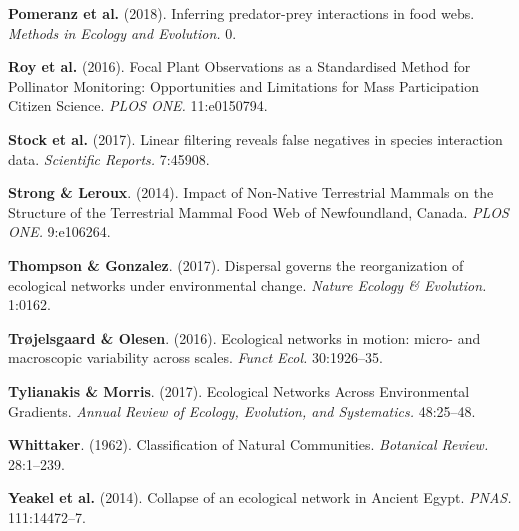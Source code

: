 \leavevmode\hypertarget{ref-PomeThom18}{}%
\textbf{Pomeranz et al.} (2018). Inferring predator-prey interactions in
food webs. \emph{Methods in Ecology and Evolution.} 0.

\leavevmode\hypertarget{ref-RoyBaxt16}{}%
\textbf{Roy et al.} (2016). Focal Plant Observations as a Standardised
Method for Pollinator Monitoring: Opportunities and Limitations for Mass
Participation Citizen Science. \emph{PLOS ONE.} 11:e0150794.

\leavevmode\hypertarget{ref-StocPois17}{}%
\textbf{Stock et al.} (2017). Linear filtering reveals false negatives
in species interaction data. \emph{Scientific Reports.} 7:45908.

\leavevmode\hypertarget{ref-StroLero14}{}%
\textbf{Strong \& Leroux}. (2014). Impact of Non-Native Terrestrial
Mammals on the Structure of the Terrestrial Mammal Food Web of
Newfoundland, Canada. \emph{PLOS ONE.} 9:e106264.

\leavevmode\hypertarget{ref-ThomGonz17}{}%
\textbf{Thompson \& Gonzalez}. (2017). Dispersal governs the
reorganization of ecological networks under environmental change.
\emph{Nature Ecology \& Evolution.} 1:0162.

\leavevmode\hypertarget{ref-TrojOles16}{}%
\textbf{Trøjelsgaard \& Olesen}. (2016). Ecological networks in motion:
micro- and macroscopic variability across scales. \emph{Funct Ecol.}
30:1926--35.

\leavevmode\hypertarget{ref-TyliMorr17}{}%
\textbf{Tylianakis \& Morris}. (2017). Ecological Networks Across
Environmental Gradients. \emph{Annual Review of Ecology, Evolution, and
Systematics.} 48:25--48.

\leavevmode\hypertarget{ref-Whit62}{}%
\textbf{Whittaker}. (1962). Classification of Natural Communities.
\emph{Botanical Review.} 28:1--239.

\leavevmode\hypertarget{ref-YeakPire14}{}%
\textbf{Yeakel et al.} (2014). Collapse of an ecological network in
Ancient Egypt. \emph{PNAS.} 111:14472--7. 
